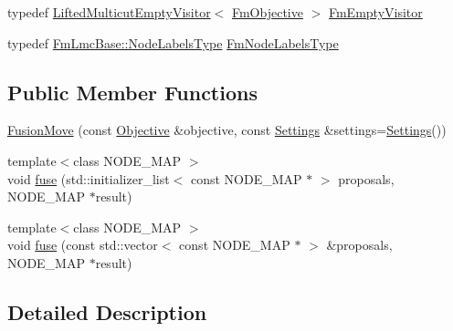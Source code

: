 \begin{DoxyCompactItemize}
\item 
typedef \hyperlink{namespacenifty_1_1graph_1_1lifted__multicut_ae8d3a07757ca6e27f2ea6ffc810c8a75}{Lifted\+Multicut\+Empty\+Visitor}$<$ \hyperlink{classnifty_1_1graph_1_1lifted__multicut_1_1FusionMove_a41ae4e1f1fa44e3a67e5a62dc3098083}{Fm\+Objective} $>$ \hyperlink{classnifty_1_1graph_1_1lifted__multicut_1_1FusionMove_a33e1bb0f26d7ebc7a034d3cd091d3f42}{Fm\+Empty\+Visitor}
\item 
typedef \hyperlink{classnifty_1_1graph_1_1optimization_1_1common_1_1SolverBase_a6e4e465f3b6e039882669fcfb9714818}{Fm\+Lmc\+Base\+::\+Node\+Labels\+Type} \hyperlink{classnifty_1_1graph_1_1lifted__multicut_1_1FusionMove_ae035e44c19bb9d5682ad108a4933d3d4}{Fm\+Node\+Labels\+Type}
\end{DoxyCompactItemize}
\subsection*{Public Member Functions}
\begin{DoxyCompactItemize}
\item 
\hyperlink{classnifty_1_1graph_1_1lifted__multicut_1_1FusionMove_ab12bf55f6a4b6271e6ad4e9de50721a9}{Fusion\+Move} (const \hyperlink{classnifty_1_1graph_1_1lifted__multicut_1_1FusionMove_a8a17b97a0a28823e4a4c37f79337b2a0}{Objective} \&objective, const \hyperlink{structnifty_1_1graph_1_1lifted__multicut_1_1FusionMove_1_1Settings}{Settings} \&settings=\hyperlink{structnifty_1_1graph_1_1lifted__multicut_1_1FusionMove_1_1Settings}{Settings}())
\item 
{\footnotesize template$<$class N\+O\+D\+E\+\_\+\+M\+A\+P $>$ }\\void \hyperlink{classnifty_1_1graph_1_1lifted__multicut_1_1FusionMove_a28550dee1cb17a4d25b37879cbcde542}{fuse} (std\+::initializer\+\_\+list$<$ const N\+O\+D\+E\+\_\+\+M\+A\+P $\ast$ $>$ proposals, N\+O\+D\+E\+\_\+\+M\+A\+P $\ast$result)
\item 
{\footnotesize template$<$class N\+O\+D\+E\+\_\+\+M\+A\+P $>$ }\\void \hyperlink{classnifty_1_1graph_1_1lifted__multicut_1_1FusionMove_a9b0d1f4b93ba04aa5ec7860b982d9b9c}{fuse} (const std\+::vector$<$ const N\+O\+D\+E\+\_\+\+M\+A\+P $\ast$ $>$ \&proposals, N\+O\+D\+E\+\_\+\+M\+A\+P $\ast$result)
\end{DoxyCompactItemize}


\subsection{Detailed Description}
